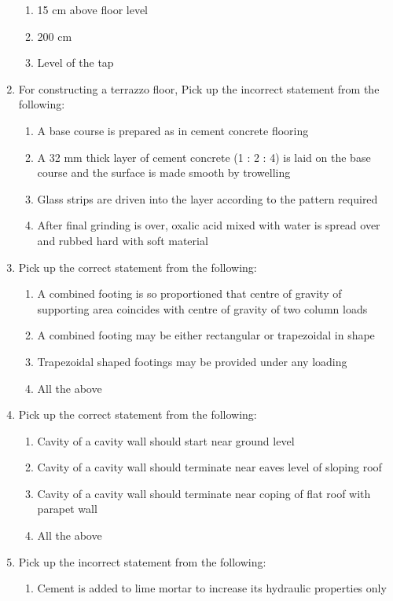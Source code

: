 \documentclass[11pt,a4paper]{article}
\begin{document}
\begin{enumerate}
\begin{enumerate}[label=\Alph*.]
\item{15 cm above floor level}
\item{200 cm}
\item{Level of the tap}
\end{enumerate}
\item{For constructing a terrazzo floor, Pick up the incorrect statement from the following:}
\begin{enumerate}[label=\Alph*.]
\item{A base course is prepared as in cement concrete flooring}
\item{A 32 mm thick layer of cement concrete (1 : 2 : 4) is laid on the base course and the surface is made smooth by trowelling}
\item{Glass strips are driven into the layer according to the pattern required}
\item{After final grinding is over, oxalic acid mixed with water is spread over and rubbed hard with soft material}
\end{enumerate}
\item{Pick up the correct statement from the following:}
\begin{enumerate}[label=\Alph*.]
\item{A combined footing is so proportioned that centre of gravity of supporting area coincides with centre of gravity of two column loads}
\item{A combined footing may be either rectangular or trapezoidal in shape}
\item{Trapezoidal shaped footings may be provided under any loading}
\item{All the above}
\end{enumerate}
\item{Pick up the correct statement from the following:}
\begin{enumerate}[label=\Alph*.]
\item{Cavity of a cavity wall should start near ground level}
\item{Cavity of a cavity wall should terminate near eaves level of sloping roof}
\item{Cavity of a cavity wall should terminate near coping of flat roof with parapet wall}
\item{All the above}
\end{enumerate}
\item{Pick up the incorrect statement from the following:}
\begin{enumerate}[label=\Alph*.]
\item{Cement is added to lime mortar to increase its hydraulic properties only}

\end{enumerate}
\end{enumerate}
\end{document}
